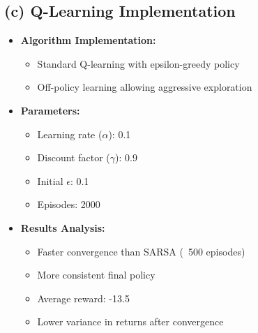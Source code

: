 \documentclass{article}
\begin{document}
\subsection*{(c) Q-Learning Implementation}
\begin{itemize}
    \item \textbf{Algorithm Implementation:}
    \begin{itemize}
        \item Standard Q-learning with epsilon-greedy policy
        \item Off-policy learning allowing aggressive exploration
    \end{itemize}
    
    \item \textbf{Parameters:}
    \begin{itemize}
        \item Learning rate ($\alpha$): 0.1
        \item Discount factor ($\gamma$): 0.9
        \item Initial $\epsilon$: 0.1
        \item Episodes: 2000
    \end{itemize}
    
    \item \textbf{Results Analysis:}
    \begin{itemize}
        \item Faster convergence than SARSA (~500 episodes)
        \item More consistent final policy
        \item Average reward: -13.5
        \item Lower variance in returns after convergence
    \end{itemize}
\end{itemize}
\end{document}
